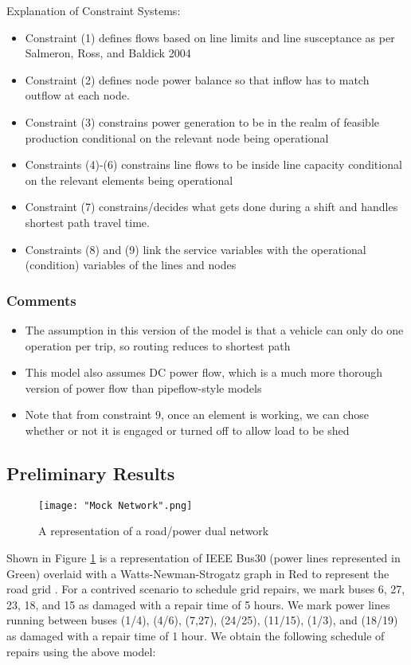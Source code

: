 \documentclass{article}
\begin{document}
Explanation of Constraint Systems:
	\begin{itemize}
		\item Constraint (1) defines flows based on line limits and line susceptance as per Salmeron, Ross, and Baldick 2004 \cite{SalmeronEA2004}
		\item Constraint (2) defines node power balance so that inflow has to match outflow at each node.
		\item Constraint (3) constrains power generation to be in the realm of feasible production conditional on the relevant node being operational
		\item Constraints (4)-(6) constrains line flows to be inside line capacity conditional on the relevant elements being operational
		\item Constraint (7) constrains/decides what gets done during a shift and handles shortest path travel time.
		\item Constraints (8) and (9) link the service variables with the operational (condition) variables of the lines and nodes
	\end{itemize}
	
	\subsubsection{Comments}
	\begin{itemize}
		\item The assumption in this version of the model is that a vehicle can only do one operation per trip, so routing reduces to shortest path
		\item This model also assumes DC power flow, which is a much more thorough version of power flow than pipeflow-style models
		\item Note that from constraint 9, once an element is working, we can chose whether or not it is engaged or turned off to allow load to be shed
	\end{itemize}
	
	\subsection{Preliminary Results}
	\begin{figure}
	\texttt{[image: "Mock Network".png]}
	\caption{A representation of a road/power dual network} \label{mocknetwork}
	\end{figure}
	Shown in Figure \ref{mocknetwork} is a representation of IEEE Bus30 (power lines represented in Green) overlaid with a Watts-Newman-Strogatz graph in Red to represent the road grid \cite{NewmanEA2001}. For a contrived scenario to schedule grid repairs, we mark buses 6, 27, 23, 18, and 15 as damaged with a repair time of 5 hours. We mark power lines running between buses (1/4), (4/6), (7,27), (24/25), (11/15), (1/3), and (18/19) as damaged with a repair time of 1 hour. We obtain the following schedule of repairs using the above model:\newline
\end{document}
